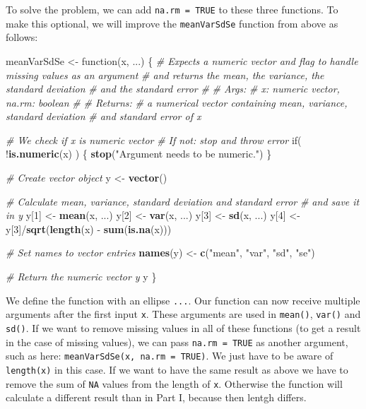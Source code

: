 \documentclass[11,]{article}
\newenvironment{Shaded}{\begin{snugshade}}{\end{snugshade}}
\newcommand{\KeywordTok}[1]{\textcolor[rgb]{0.13,0.29,0.53}{\textbf{{#1}}}}
\newcommand{\DecValTok}[1]{\textcolor[rgb]{0.00,0.00,0.81}{{#1}}}
\newcommand{\StringTok}[1]{\textcolor[rgb]{0.31,0.60,0.02}{{#1}}}
\newcommand{\CommentTok}[1]{\textcolor[rgb]{0.56,0.35,0.01}{\textit{{#1}}}}
\newcommand{\NormalTok}[1]{{#1}}
\begin{document}
To solve the problem, we can add \texttt{na.rm\ =\ TRUE} to these three
functions. To make this optional, we will improve the
\texttt{meanVarSdSe} function from above as follows:

\begin{Shaded}
\begin{Highlighting}[]
\NormalTok{meanVarSdSe <-}\StringTok{ }\NormalTok{function(x, ...) \{}
  \CommentTok{# Expects a numeric vector and flag to handle missing values as an argument}
  \CommentTok{# and returns the mean, the variance, the standard deviation}
  \CommentTok{# and the standard error}
  \CommentTok{# }
  \CommentTok{# Args:}
  \CommentTok{#   x: numeric vector, na.rm: boolean}
  \CommentTok{#}
  \CommentTok{# Returns:}
  \CommentTok{#   a numerical vector containing mean, variance, standard deviation}
  \CommentTok{#   and standard error of x}
  
  \CommentTok{# We check if x is numeric vector}
  \CommentTok{# If not: stop and throw error}
  \NormalTok{if( !}\KeywordTok{is.numeric}\NormalTok{(x) ) \{}
    \KeywordTok{stop}\NormalTok{(}\StringTok{"Argument needs to be numeric."}\NormalTok{)}
  \NormalTok{\}}
  
  \CommentTok{# Create vector object}
  \NormalTok{y <-}\StringTok{ }\KeywordTok{vector}\NormalTok{()}
  
  \CommentTok{# Calculate mean, variance, standard deviation and standard error}
  \CommentTok{# and save it in y}
  \NormalTok{y[}\DecValTok{1}\NormalTok{] <-}\StringTok{ }\KeywordTok{mean}\NormalTok{(x, ...)}
  \NormalTok{y[}\DecValTok{2}\NormalTok{] <-}\StringTok{ }\KeywordTok{var}\NormalTok{(x, ...)}
  \NormalTok{y[}\DecValTok{3}\NormalTok{] <-}\StringTok{ }\KeywordTok{sd}\NormalTok{(x, ...)}
  \NormalTok{y[}\DecValTok{4}\NormalTok{] <-}\StringTok{ }\NormalTok{y[}\DecValTok{3}\NormalTok{]/}\KeywordTok{sqrt}\NormalTok{(}\KeywordTok{length}\NormalTok{(x) -}\StringTok{ }\KeywordTok{sum}\NormalTok{(}\KeywordTok{is.na}\NormalTok{(x)))}
  
  \CommentTok{# Set names to vector entries}
  \KeywordTok{names}\NormalTok{(y) <-}\StringTok{ }\KeywordTok{c}\NormalTok{(}\StringTok{"mean"}\NormalTok{, }\StringTok{"var"}\NormalTok{, }\StringTok{"sd"}\NormalTok{, }\StringTok{"se"}\NormalTok{)}
  
  \CommentTok{# Return the numeric vector y}
  \NormalTok{y}
\NormalTok{\}}
\end{Highlighting}
\end{Shaded}

We define the function with an ellipse \texttt{...}. Our function can
now receive multiple arguments after the first input \texttt{x}. These
arguments are used in \texttt{mean()}, \texttt{var()} and \texttt{sd()}.
If we want to remove missing values in all of these functions (to get a
result in the case of missing values), we can pass
\texttt{na.rm\ =\ TRUE} as another argument, such as here:
\texttt{meanVarSdSe(x,\ na.rm\ =\ TRUE)}. We just have to be aware of
\texttt{length(x)} in this case. If we want to have the same result as
above we have to remove the sum of \texttt{NA} values from the length of
\texttt{x}. Otherwise the function will calculate a different result
than in Part I, because then lentgh differs.
\end{document}
